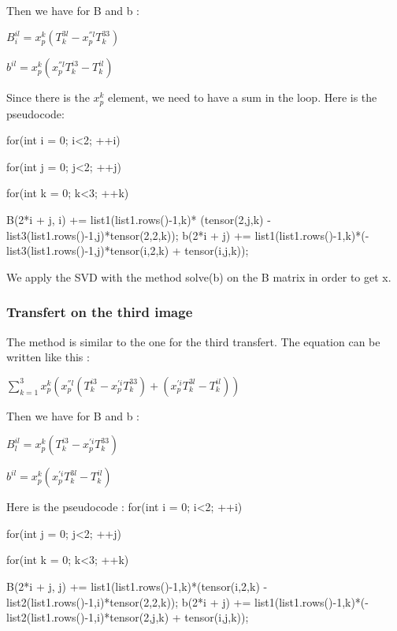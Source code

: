 \documentclass{report}
\begin{document}
Then we have for B and b :  
\begin{center}
$B_{i}^{il} = x_{p}^{k}(T_{k}^{3l} - x_{p}^{''l}T_{k}^{33})$
\end{center}
\begin{center}
$b^{il} = x_{p}^{k}(x_{p}^{''l}T_{k}^{i3} - T_{k}^{il})$
\end{center}

Since there is the $x_{p}^{k}$ element, we need to have a sum in the loop. Here is the pseudocode:

for(int i = 0; i<2; ++i) {
              for(int j = 0; j<2; ++j) {
                for(int k = 0; k<3; ++k) {
                  B(2*i + j, i) +=  list1(list1.rows()-1,k)*  (tensor(2,j,k) - list3(list1.rows()-1,j)*tensor(2,2,k));
                  b(2*i + j) += list1(list1.rows()-1,k)*(-list3(list1.rows()-1,j)*tensor(i,2,k) + tensor(i,j,k));

                }
              }
            }  

We apply the SVD with the method solve(b) on the B matrix in order to get x. 

\subsubsection{Transfert on the third image}
The method is similar to the one for the third transfert.
The equation can be written like this : 

\begin{center}
 $ \displaystyle { \sum_{k = 1}^{3}} x_{p}^{k}(x_{p}^{''l}(T_{k}^{i3} - x_{p}^{'i}T_{k}^{33}) + ( x_{p}^{'i}T_{k}^{3l} - T_{k}^{il}))$ 
\end{center}

Then we have for B and b :  
\begin{center}
$B_{l}^{il} = x_{p}^{k}(T_{k}^{i3} - x_{p}^{'i}T_{k}^{33})$
\end{center}
\begin{center}
$b^{il} = x_{p}^{k}(x_{p}^{'i}T_{k}^{3l} - T_{k}^{il})$
\end{center}

Here is the pseudocode : 
for(int i = 0; i<2; ++i) {
              for(int j = 0; j<2; ++j) {
                for(int k = 0; k<3; ++k) {
                  B(2*i + j, j) +=  list1(list1.rows()-1,k)*(tensor(i,2,k) - list2(list1.rows()-1,i)*tensor(2,2,k));
                  b(2*i + j) += list1(list1.rows()-1,k)*(-list2(list1.rows()-1,i)*tensor(2,j,k) + tensor(i,j,k));

                }
              }
            }
\end{document}
